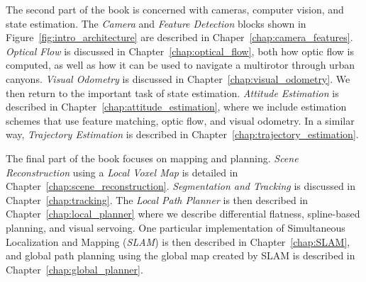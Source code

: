 The second part of the book is concerned with cameras, computer vision, and state estimation.  The {\em Camera} and {\em Feature Detection} blocks shown in Figure~\ref{fig:intro_architecture} are described in Chaper~\ref{chap:camera_features}.  {\em Optical Flow} is discussed in Chapter~\ref{chap:optical_flow}, both how optic flow is computed, as well as how it can be used to navigate a multirotor through urban canyons.  
%
{\em Visual Odometry} is discussed in Chapter~\ref{chap:visual_odometry}.  We then return to the important task of state estimation.  {\em Attitude Estimation} is described in Chapter~\ref{chap:attitude_estimation}, where we include estimation schemes that use feature matching, optic flow, and visual odometry.  In a similar way, {\em Trajectory Estimation} is described in Chapter~\ref{chap:trajectory_estimation}. 

The final part of the book focuses on mapping and planning.  {\em Scene Reconstruction} using a {\em Local Voxel Map} is detailed in Chapter~\ref{chap:scene_reconstruction}.  {\em Segmentation and Tracking} is discussed in Chapter~\ref{chap:tracking}.  The {\em Local Path Planner} is then described in Chapter~\ref{chap:local_planner} where we describe differential flatness, spline-based planning, and visual servoing.  One particular implementation of Simultaneous Localization and Mapping ({\em SLAM}) is then described in Chapter~\ref{chap:SLAM}, and global path planning using the global map created by SLAM is described in Chapter~\ref{chap:global_planner}.





